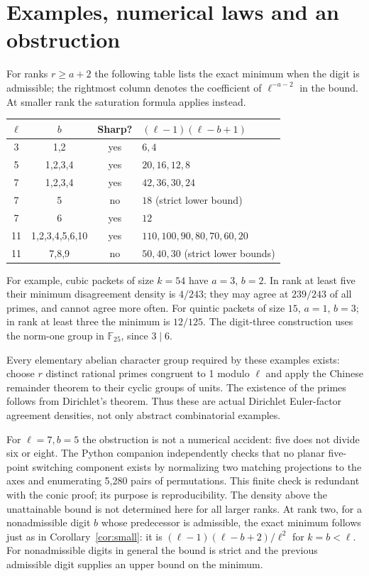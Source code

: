 \documentclass[11pt]{article}
\theoremstyle{remark}\newtheorem{remark}[theorem]{Remark}
\newcommand{\F}{\mathbb F}
\begin{document}
\section{Examples, numerical laws and an obstruction}
For ranks $r\ge a+2$ the following table lists the exact minimum when the digit is admissible; the rightmost column denotes the coefficient of $\ell^{-a-2}$ in the bound. At smaller rank the saturation formula applies instead.
\begin{center}
\begin{tabular}{cccl}
\toprule
$\ell$ & $b$ & Sharp? & $(\ell-1)(\ell-b+1)$\\
\midrule
3 & 1,2 & yes & $6,4$\\
5 & 1,2,3,4 & yes & $20,16,12,8$\\
7 & 1,2,3,4 & yes & $42,36,30,24$\\
7 & 5 & no & $18$ (strict lower bound)\\
7 & 6 & yes & $12$\\
11 & 1,2,3,4,5,6,10 & yes & $110,100,90,80,70,60,20$\\
11 & 7,8,9 & no & $50,40,30$ (strict lower bounds)\\
\bottomrule
\end{tabular}
\end{center}
For example, cubic packets of size $k=54$ have $a=3$, $b=2$. In rank at least five their minimum disagreement density is $4/243$; they may agree at $239/243$ of all primes, and cannot agree more often. For quintic packets of size $15$, $a=1$, $b=3$; in rank at least three the minimum is $12/125$. The digit-three construction uses the norm-one group in $\F_{25}$, since $3\mid6$.

Every elementary abelian character group required by these examples exists: choose $r$ distinct rational primes congruent to 1 modulo $\ell$ and apply the Chinese remainder theorem to their cyclic groups of units. The existence of the primes follows from Dirichlet's theorem. Thus these are actual Dirichlet Euler-factor agreement densities, not only abstract combinatorial examples.

For $\ell=7,b=5$ the obstruction is not a numerical accident: five does not divide six or eight. The Python companion independently checks that no planar five-point switching component exists by normalizing two matching projections to the axes and enumerating 5,280 pairs of permutations. This finite check is redundant with the conic proof; its purpose is reproducibility. The density above the unattainable bound is not determined here for all larger ranks. At rank two, for a nonadmissible digit $b$ whose predecessor is admissible, the exact minimum follows just as in Corollary~\ref{cor:small}: it is $(\ell-1)(\ell-b+2)/\ell^2$ for $k=b<\ell$. For nonadmissible digits in general the bound is strict and the previous admissible digit supplies an upper bound on the minimum.
\end{document}
